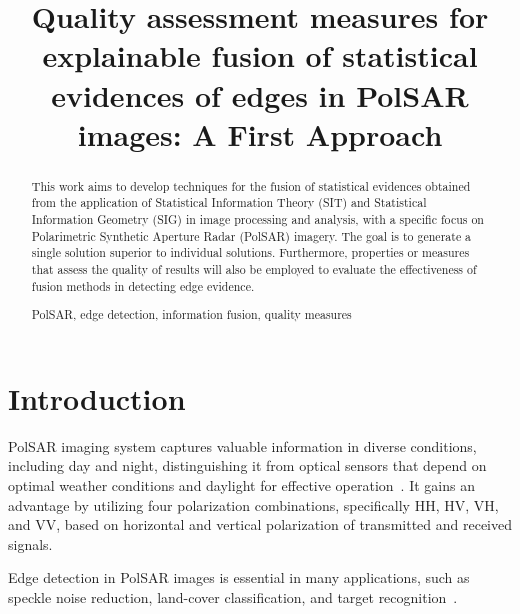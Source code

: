 \documentclass{article}
\title{Quality assessment measures for explainable fusion of statistical evidences of edges in PolSAR images: A First Approach}
\begin{document}
%
\maketitle
%
\begin{abstract}

This work aims to develop techniques for the fusion of statistical evidences obtained from the application of Statistical Information Theory (SIT) and Statistical Information Geometry (SIG) in image processing and analysis, with a specific focus on Polarimetric Synthetic Aperture Radar (PolSAR) imagery. The goal is to generate a single solution superior to individual solutions. Furthermore, properties or measures that assess the quality of results will also be employed to evaluate the effectiveness of fusion methods in detecting edge evidence.

\begin{keywords}
PolSAR, edge detection,  information fusion,  quality measures 
\end{keywords}
%
\end{abstract}

\vspace{-0.3cm}
\section{Introduction} \sloppy
\vspace{-0.2cm}
PolSAR imaging system captures valuable information in diverse conditions, including day and night, distinguishing it from optical sensors that depend on optimal weather conditions and daylight for effective operation~\cite{Hua2022}. It gains an advantage by utilizing four polarization combinations, specifically HH, HV, VH, and VV, based on horizontal and vertical polarization of transmitted and received signals. 

Edge detection in PolSAR images is essential in many applications, such as speckle noise reduction, land-cover classification, and target recognition~\cite{Jin2016}. 
\end{document}
